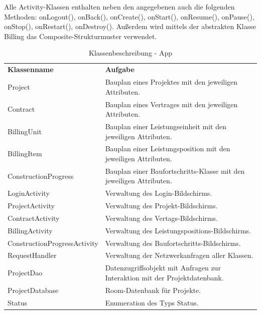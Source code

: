 \noindent
Alle Activity-Klassen enthalten neben den angegebenen auch die folgenden Methoden: onLogout(), onBack(), onCreate(), onStart(), onResume(), onPause(), onStop(), onRestart(), onDestroy().
Außerdem wird mittels der abstrakten Klasse Billing das Composite-Strukturmuster verwendet.\\

\clearpage

\begin{table}[h]
	\centering
	\begin{tabularx}{\textwidth}{X X}
		\rowcolor[HTML]{C0C0C0} 
		\textbf{Klassenname} & \textbf{Aufgabe} \\
		Project & Bauplan eines Projektes mit den jeweiligen Attributen.\\
		\rowcolor[HTML]{E7E7E7} 
		Contract & Bauplan eines Vertrages mit den jeweiligen Attributen. \\
		BillingUnit & Bauplan einer Leistungseinheit mit den jeweiligen Attributen. \\
		\rowcolor[HTML]{E7E7E7} 
		BillingItem & Bauplan einer Leistungsposition mit den jeweiligen Attributen. \\
		ConstructionProgress & Bauplan einer Baufortschritts-Klasse mit den jeweiligen Attributen. \\
		\rowcolor[HTML]{E7E7E7} 
		LoginActivity & Verwaltung des Login-Bildschirms. \\
		ProjectActivity & Verwaltung des Projekt-Bildschirms. \\
		\rowcolor[HTML]{E7E7E7} 
		ContractActivity & Verwaltung des Vertags-Bildschirms. \\
		BillingActivity & Verwaltung des Leistungspositions-Bildschirms. \\
		\rowcolor[HTML]{E7E7E7} 
		ConstructionProgressActivity & Verwaltung des Baufortschritts-Bildschirms. \\
		RequestHandler & Verwaltung der Netzwerkanfragen aller Klassen. \\
		\rowcolor[HTML]{E7E7E7} 
		ProjectDao & Datenzugriffsobjekt mit Anfragen zur Interaktion mit der Projektdatenbank. \\
		ProjectDatabase & Room-Datenbank für Projekte. \\
		\rowcolor[HTML]{E7E7E7}
		Status & Enumeration des Typs Status.
	\end{tabularx}
	\caption{Klassenbeschreibung - App}
	\label{table:klassenbeschreibung-a}
\end{table}
